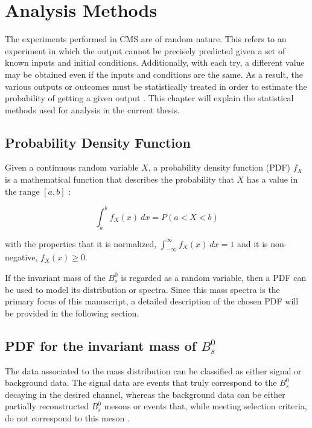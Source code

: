 \chapter[\leavevmode\newline Analysis Methods]{Analysis Methods}
\label{chap:Chapter_4}

The experiments performed in CMS are of random nature. This refers to an experiment in which the output cannot be precisely predicted given a set of known inputs and initial conditions. Additionally, with each try, a different value may be obtained even if the inputs and conditions are the same. As a result, the various outputs or outcomes must be statistically treated in order to estimate the probability of getting a given output \cite{vsirca2016probability}. This chapter will explain the statistical methods used for analysis in the current thesis.
\section{Probability Density Function}

Given a continuous random variable $X$, a probability density function (PDF) $f_X$ is a mathematical function that describes the probability that $X$ has a value in the range $[a, b]$ \cite{bragagnolo2021measurement, vsirca2016probability}:

\begin{equation}
	\int_{a}^{b} f_X(x) \ dx = P(a < X < b)
\end{equation}

with the properties that it is normalized, $\int_{-\infty}^{\infty} f_X(x) \ dx = 1$ and it is non-negative, $f_X(x) \geq 0$.

If the invariant mass of the $B^0_s$ is regarded as a random variable, then a PDF can be used to model its distribution or spectra. Since this mass spectra is the primary focus of this manuscript, a detailed description of the chosen PDF will be provided in the following section.
\section{PDF for the invariant mass of $B^0_s$}
The data associated to the mass distribution can be classified as either signal or background data. The signal data are events that truly correspond to the $B^0_s$ decaying in the desired channel, whereas the background data can be either partially reconstructed $B^0_s$ mesons or events that, while meeting selection criteria, do not correspond to this meson \cite{mejia2012medida}.

